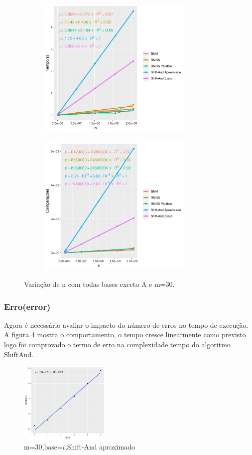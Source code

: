 \documentclass[11pt]{article}
\begin{document}
\begin{figure}
\begin{subfigure}[b]{.49\linewidth}
\centering
\includegraphics[width=7.5cm]{nxtime}
\caption{}\label{fig:nxtime}
\end{subfigure}
\begin{subfigure}[b]{.49\linewidth}
\centering
\includegraphics[width=7.5cm]{nxcomp}
\caption{}\label{fig:nxcomp}
\end{subfigure}
\caption{Variação de n com todas bases exceto A e m=30.}\label{fig:nxg}
\end{figure}

\subsubsection{Erro(error)}
\label{sec:org4f1a0a0}
Agora é necessário avaliar o impacto do número de erros no tempo de execução. A figura \ref{fig:errorxtime} mostra o comportamento, o tempo cresce linearmente como previsto logo foi comprovado o termo de erro na complexidade tempo do algoritmo ShiftAnd.

\begin{figure}
\caption{m=30,base=$\iota$,Shift-And aproximado}\label{fig:errorxtime}
\includegraphics[width=4.3cm]{errorxtime}
\end{figure} 
\end{document}
